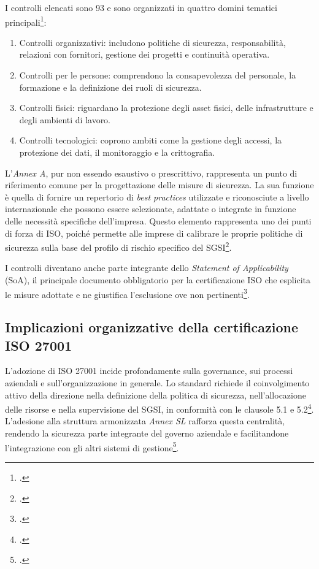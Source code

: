 I controlli elencati sono 93 e sono organizzati in quattro domini tematici principali\footcite[pp. 28--29]{watkins-iso}:
\begin{enumerate}
    \item Controlli organizzativi: includono politiche di sicurezza, responsabilità, relazioni con fornitori, gestione dei progetti e continuità operativa.
    \item Controlli per le persone: comprendono la consapevolezza del personale, la formazione e la definizione dei ruoli di sicurezza.
	\item Controlli fisici: riguardano la protezione degli asset fisici, delle infrastrutture e degli ambienti di lavoro.
	\item Controlli tecnologici: coprono ambiti come la gestione degli accessi, la protezione dei dati, il monitoraggio e la crittografia.
\end{enumerate}

L'\textit{Annex A}, pur non essendo esaustivo o prescrittivo, rappresenta un punto di riferimento comune per la 
progettazione delle misure di sicurezza. La sua funzione è quella di fornire un repertorio di \textit{best practices} utilizzate e riconosciute a 
livello internazionale che possono essere selezionate, adattate o integrate in funzione delle necessità specifiche dell'impresa. 
Questo elemento rappresenta uno dei punti di forza di ISO, poiché permette alle imprese di calibrare le proprie 
politiche di sicurezza sulla base del profilo di rischio specifico del SGSI\footcite[p. 22]{watkins-iso}.

I controlli diventano anche parte integrante dello \textit{Statement of Applicability} (SoA), il principale
documento obbligatorio per la certificazione ISO che esplicita le misure adottate e ne giustifica l’esclusione ove non pertinenti\footcite[pp. 4--5]{iso27001}.


\subsection{Implicazioni organizzative della certificazione ISO 27001}
L’adozione di ISO 27001 incide profondamente sulla governance, 
sui processi aziendali e sull'organizzazione in generale. Lo standard richiede il coinvolgimento attivo della direzione nella definizione della 
politica di sicurezza, nell’allocazione delle risorse e nella supervisione del SGSI, in conformità con le clausole 5.1 e 5.2\footcite[pp. 2--3]{iso27001}. 
L’adesione alla struttura armonizzata \textit{Annex SL} rafforza questa centralità, rendendo la sicurezza parte integrante del governo aziendale e facilitandone 
l’integrazione con gli altri sistemi di gestione\footcite{uni-harmonized-structure}.

